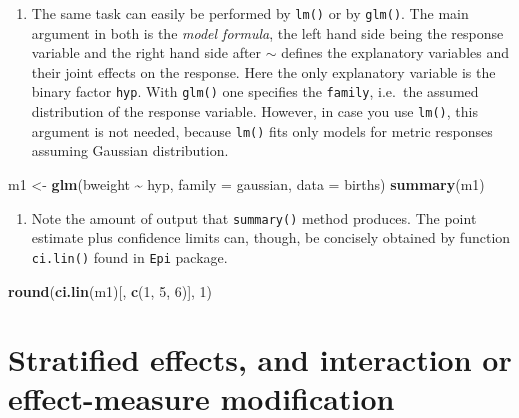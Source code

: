 \documentclass[
]{book}
\newenvironment{Shaded}{\begin{snugshade}}{\end{snugshade}}
\newcommand{\AttributeTok}[1]{\textcolor[rgb]{0.13,0.29,0.53}{#1}}
\newcommand{\DecValTok}[1]{\textcolor[rgb]{0.00,0.00,0.81}{#1}}
\newcommand{\FunctionTok}[1]{\textcolor[rgb]{0.13,0.29,0.53}{\textbf{#1}}}
\newcommand{\NormalTok}[1]{#1}
\newcommand{\OtherTok}[1]{\textcolor[rgb]{0.56,0.35,0.01}{#1}}
\newcommand{\SpecialCharTok}[1]{\textcolor[rgb]{0.81,0.36,0.00}{\textbf{#1}}}
\providecommand{\tightlist}{%
  \setlength{\itemsep}{0pt}\setlength{\parskip}{0pt}}
\begin{document}
\begin{enumerate}
\def\labelenumi{\arabic{enumi}.}
\setcounter{enumi}{1}
\tightlist
\item
  The same task can easily be performed by \texttt{lm()} or by \texttt{glm()}.
  The main argument in both
  is the \emph{model formula}, the left hand side being the response variable
  and the right hand side
  after \(\sim\) defines the explanatory variables and their
  joint effects on the response. Here the only
  explanatory variable is the binary factor \texttt{hyp}. With \texttt{glm()} one specifies the
  \texttt{family}, i.e.~the assumed distribution of the response variable. However,
  in case you use
  \texttt{lm()}, this argument is not needed, because \texttt{lm()} fits only
  models for metric responses assuming Gaussian distribution.
\end{enumerate}

\begin{Shaded}
\begin{Highlighting}[]
\NormalTok{m1 }\OtherTok{\textless{}{-}} \FunctionTok{glm}\NormalTok{(bweight }\SpecialCharTok{\textasciitilde{}}\NormalTok{ hyp, }\AttributeTok{family =}\NormalTok{ gaussian, }\AttributeTok{data =}\NormalTok{ births)}
\FunctionTok{summary}\NormalTok{(m1)}
\end{Highlighting}
\end{Shaded}

\begin{enumerate}
\def\labelenumi{\arabic{enumi}.}
\setcounter{enumi}{2}
\tightlist
\item
  Note the amount of output that \texttt{summary()} method produces.
  The point estimate plus confidence limits can, though, be concisely obtained by function \texttt{ci.lin()} found in \texttt{Epi} package.
\end{enumerate}

\begin{Shaded}
\begin{Highlighting}[]
\FunctionTok{round}\NormalTok{(}\FunctionTok{ci.lin}\NormalTok{(m1)[, }\FunctionTok{c}\NormalTok{(}\DecValTok{1}\NormalTok{, }\DecValTok{5}\NormalTok{, }\DecValTok{6}\NormalTok{)], }\DecValTok{1}\NormalTok{)}
\end{Highlighting}
\end{Shaded}

\section{Stratified effects, and interaction or effect-measure modification}\label{stratified-effects-and-interaction-or-effect-measure-modification}
\end{document}
